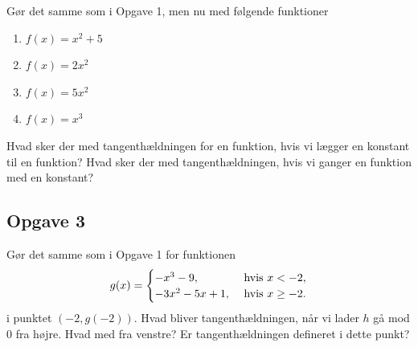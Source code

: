 Gør det samme som i Opgave 1, men nu med følgende funktioner
\begin{enumerate}[label=\roman*)]
	\item $f(x) = x^2 + 5$
	\item $f(x) = 2x^2$
	\item $f(x) = 5x^2$
	\item $f(x) = x^3$
\end{enumerate}

Hvad sker der med tangenthældningen for en funktion, hvis vi lægger en konstant til en funktion? Hvad sker der med tangenthældningen, hvis vi ganger en funktion med en konstant?

\subsection*{Opgave 3}

Gør det samme som i Opgave 1 for funktionen
\begin{align*}
	g(x) = 
	\begin{cases}
		-x^3 - 9, &\textnormal{ hvis } x < -2,\\
		-3x^2- 5x + 1, &\textnormal{ hvis } x \geq -2. 
	\end{cases}
\end{align*}
i punktet $(-2,g(-2))$. Hvad bliver tangenthældningen, når vi lader $h$ gå mod 0 fra højre. Hvad med fra venstre? Er tangenthældningen defineret i dette punkt?
